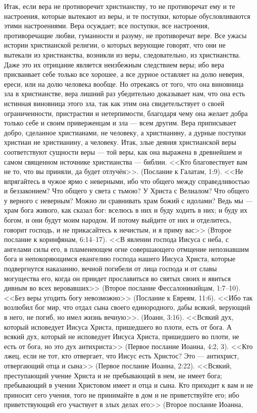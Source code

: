 \documentclass[12pt,oneside]{book}
\begin{document}
Итак, если вера не противоречит христианству, то не противоречат ему и те настроения, которые вытекают из веры, и те поступки, которые обусловливаются этими настроениями. Вера осуждает; все поступки, все настроения, противоречащие любви, гуманности и разуму, не противоречат вере. Все ужасы истории христианской религии, о которых верующие говорят, что они не вытекали из христианства, возникли из веры, следовательно, из христианства. Даже это их отрицание является неизбежным следствием веры; ибо вера присваивает себе только все хорошее, а все дурное оставляет на долю неверия, ереси, или на долю человека вообще. Но отрекаясь от того, что она виновница зла в христианстве, вера лишний раз убедительно доказывает нам, что она есть истинная виновница этого зла, так как этим она свидетельствует о своей ограниченности, пристрастии и нетерпимости, благодаря чему она желает добра только себе и своим приверженцам и зла --- всем другим. Вера приписывает добро, сделанное христианами, не человеку, а христианину, а дурные поступки христиан не христианину, а человеку. Итак, злые деяния христианской веры соответствуют сущности веры --- той веры, как она выражена в древнейшем и самом священном источнике христианства --- библии. <<Кто благовествует вам не то, что вы приняли, да будет отлучён>>\ddag\let\svthefootnote\thefootnote\let\thefootnote\relax{}\let\thefootnote\svthefootnote. (Послание к Галатам, 1:9). <<Не впрягайтесь в чужое ярмо с неверными, ибо что общего между справедливостью и беззаконием? Что общего у света с тьмою? У Христа с Велиалом? Что общего у верного с неверным? Можно ли сравнивать храм божий с идолами? Ведь мы --- храм бога живого, как сказал бог: вселюсь в них и буду ходить в них; и буду их богом, и они будут моим народом. И потому выйдите от них и отделитесь, говорит господь, и не прикасайтесь к нечистым, и я приму вас>> (Второе послание к коринфянам, 6:14--17). <<В явлении господа Иисуса с неба, с ангелами силы его, в пламенеющем огне совершающего отмщение непознавшим бога и непокоряющимся евангелию господа нашего Иисуса Христа, которые подвергнутся наказанию, вечной погибели от лица господа и от славы могущества его, когда он приидет прославиться во святых своих и явиться дивным во всех веровавших>> (Второе послание Фессалоникийцам, 1:7--10). <<Без веры угодить богу невозможно>> (Послание к Евреям, 11:6). <<Ибо так возлюбил бог мир, что отдал сына своего единородного, дабы всякий, верующий в него, не погиб, но имел жизнь вечную>>. (Иоанн, 3:16). <<Всякий дух, который исповедует Иисуса Христа, пришедшего во плоти, есть от бога. А всякий дух, который не исповедует Иисуса Христа, пришедшего во плоти, не есть от бога, но это дух антихриста>> (Первое послание Иоанна, 4:2, 3). <<Кто лжец, если не тот, кто отвергает, что Иисус есть Христос? Это --- антихрист, отвергающий отца и сына>> (Первое послание Иоанна, 2:22). <<Всякий, преступающий учение Христа и не пребывающий в нем, не имеет бога; пребывающий в учении Христовом имеет и отца и сына. Кто приходит к вам и не приносит сего учения, того не принимайте в дом и не приветствуйте его; ибо приветствующий его участвует в злых делах его>> (Второе послание Иоанна, 
\end{document}
